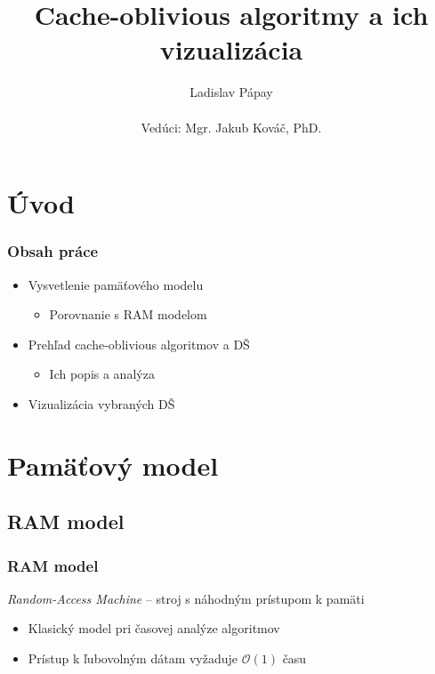 \documentclass{beamer}
\title{Cache-oblivious algoritmy a ich vizualizácia}
\author[Ladislav Pápay]{Ladislav Pápay \\ ~ \\ Vedúci: Mgr. Jakub Kováč, PhD.}
\date{}
\newcommand{\bigO}{\ensuremath{\mathcal{O}}}
\begin{document}
\frame{\titlepage}

\section{Úvod}
\begin{frame}
    \frametitle{Obsah práce}
    \begin{itemize}
        \item Vysvetlenie pamäťového modelu
        \begin{itemize}
            \item Porovnanie s RAM modelom
        \end{itemize}
        \item Prehľad cache-oblivious algoritmov a DŠ
        \begin{itemize}
            \item Ich popis a analýza
        \end{itemize}
        \item Vizualizácia vybraných DŠ
    \end{itemize}
\end{frame}

\section{Pamäťový model}
\subsection{RAM model}
\begin{frame}
    \frametitle{RAM model}%
    \emph{Random-Access Machine} -- stroj s náhodným prístupom k pamäti
    \begin{itemize}
        \item Klasický model pri časovej analýze algoritmov
        \item Prístup k ľubovolným dátam vyžaduje $\bigO(1)$ času
    \end{itemize}
\end{frame}
\end{document}
